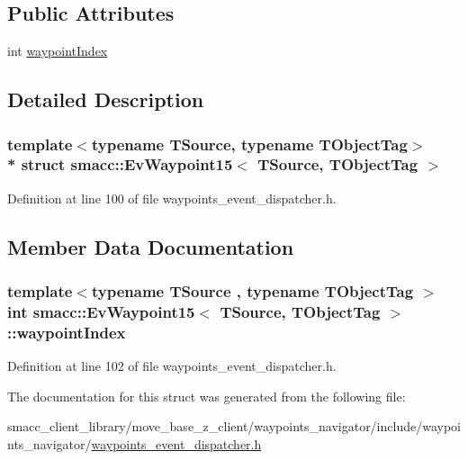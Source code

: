 \subsection*{Public Attributes}
\begin{DoxyCompactItemize}
\item 
int \hyperlink{structsmacc_1_1EvWaypoint15_a81836c2d7496a8f59fcfc302dec5eed6}{waypoint\+Index}
\end{DoxyCompactItemize}


\subsection{Detailed Description}
\subsubsection*{template$<$typename T\+Source, typename T\+Object\+Tag$>$\\*
struct smacc\+::\+Ev\+Waypoint15$<$ T\+Source, T\+Object\+Tag $>$}



Definition at line 100 of file waypoints\+\_\+event\+\_\+dispatcher.\+h.



\subsection{Member Data Documentation}
\subsubsection[{\texorpdfstring{waypoint\+Index}{waypointIndex}}]{\setlength{\rightskip}{0pt plus 5cm}template$<$typename T\+Source , typename T\+Object\+Tag $>$ int {\bf smacc\+::\+Ev\+Waypoint15}$<$ T\+Source, T\+Object\+Tag $>$\+::waypoint\+Index}\hypertarget{structsmacc_1_1EvWaypoint15_a81836c2d7496a8f59fcfc302dec5eed6}{}\label{structsmacc_1_1EvWaypoint15_a81836c2d7496a8f59fcfc302dec5eed6}


Definition at line 102 of file waypoints\+\_\+event\+\_\+dispatcher.\+h.



The documentation for this struct was generated from the following file\+:\begin{DoxyCompactItemize}
\item 
smacc\+\_\+client\+\_\+library/move\+\_\+base\+\_\+z\+\_\+client/waypoints\+\_\+navigator/include/waypoints\+\_\+navigator/\hyperlink{waypoints__event__dispatcher_8h}{waypoints\+\_\+event\+\_\+dispatcher.\+h}\end{DoxyCompactItemize}
